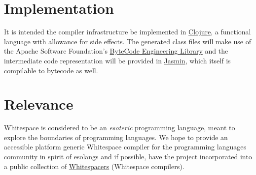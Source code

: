 \documentclass[10pt,letter]{article}
\begin{document}
	\section{Implementation}
		It is intended the compiler infrastructure be implemented in \href{https://clojure.org/index}{Clojure}, a functional language with allowance for side effects. The generated class files will make use of the Apache Software Foundation's \href{https://commons.apache.org/proper/commons-bcel/index.html}{ByteCode Engineering Library} and the intermediate code representation will be provided in \href{http://jasmin.sourceforge.net/}{Jasmin}, which itself is compilable to bytecode as well.
	\section{Relevance}
		Whitespace is considered to be an \textit{esoteric} programming language, meant to explore the boundaries of programming languages. We hope to provide an accessible platform generic Whitespace compiler for the programming languages community in spirit of esolangs and if possible, have the project incorporated into a public collection of \href{https://github.com/hostilefork/whitespacers/}{Whitespacers} (Whitespace compilers).
\end{document}
